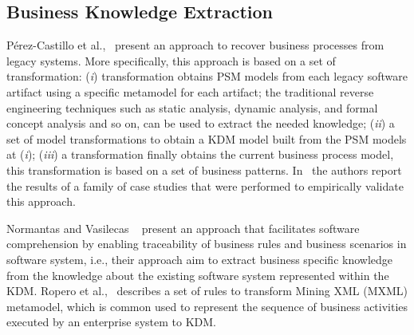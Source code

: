 \subsection{Business Knowledge Extraction}
\label{ssub:Business_Knowledge_Extraction}

 P\'{e}rez-Castillo et al.,~\cite{Perez-Castillo:2011:ECS:1982185.1982249,6080834, 6498507,Perez-Castillo:2010:IBP:1875847.1875861} present an approach to recover business processes from legacy systems. More specifically, this approach is based on a set of transformation: (\textit{i}) transformation obtains PSM models from each legacy software artifact using a specific metamodel for each artifact; the traditional reverse engineering techniques such as static analysis, dynamic analysis, and formal concept analysis and so on, can be used to extract the needed knowledge; (\textit{ii}) a set of model transformations to obtain a KDM model built from the PSM models at (\textit{i}); (\textit{iii}) a transformation finally obtains the current business process model, this transformation is based on a set of business patterns. In~\cite{PerezCastillo20121370} the authors report the results of a family of case studies that were performed to empirically validate this approach. %

Normantas and Vasilecas ~\cite{lastDAyOFMyLife} present an approach that facilitates software comprehension by enabling traceability of business rules and business scenarios in software system, i.e., their approach aim to extract business specific knowledge from the knowledge about the existing software system represented within the KDM. Ropero et al.,~\cite{Fernandez-Ropero:2012:EAB:2367051.2367064} describes a set of rules to transform Mining XML (MXML) metamodel, which is common used to represent the sequence of business activities executed by an enterprise system to KDM. %


